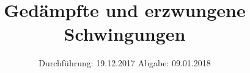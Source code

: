 

\subject{Versuch 354}
\title{Gedämpfte und erzwungene Schwingungen}
\date{%
  Durchführung: 19.12.2017
  \hspace{3em}
  Abgabe: 09.01.2018
}



\maketitle
\thispagestyle{empty}
\tableofcontents
\newpage






\printbibliography{}


